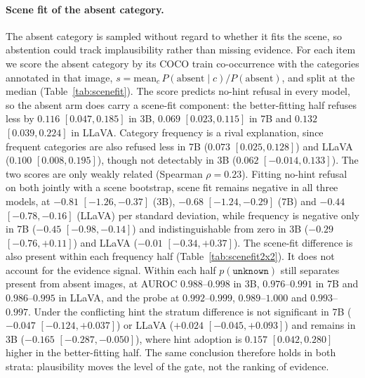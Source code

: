 \documentclass[10pt]{article}
\newcommand{\unknown}{\texttt{unknown}}
\newcommand{\punk}{p(\unknown)}
\begin{document}
\paragraph{Scene fit of the absent category.}
The absent category is sampled without regard to whether it fits the scene, so abstention could track implausibility rather than missing evidence. For each item we score the absent category by its COCO train co-occurrence with the categories annotated in that image, $s=\mathrm{mean}_c\,P(\text{absent}\mid c)/P(\text{absent})$, and split at the median (Table~\ref{tab:scenefit}). The score predicts no-hint refusal in every model, so the absent arm does carry a scene-fit component: the better-fitting half refuses less by $0.116$ $[0.047,0.185]$ in 3B, $0.069$ $[0.023,0.115]$ in 7B and $0.132$ $[0.039,0.224]$ in LLaVA. Category frequency is a rival explanation, since frequent categories are also refused less in 7B ($0.073$ $[0.025,0.128]$) and LLaVA ($0.100$ $[0.008,0.195]$), though not detectably in 3B ($0.062$ $[-0.014,0.133]$). The two scores are only weakly related (Spearman $\rho=0.23$). Fitting no-hint refusal on both jointly with a scene bootstrap, scene fit remains negative in all three models, at $-0.81$ $[-1.26,-0.37]$ (3B), $-0.68$ $[-1.24,-0.29]$ (7B) and $-0.44$ $[-0.78,-0.16]$ (LLaVA) per standard deviation, while frequency is negative only in 7B ($-0.45$ $[-0.98,-0.14]$) and indistinguishable from zero in 3B ($-0.29$ $[-0.76,+0.11]$) and LLaVA ($-0.01$ $[-0.34,+0.37]$). The scene-fit difference is also present within each frequency half (Table~\ref{tab:scenefit2x2}). It does not account for the evidence signal. Within each half $\punk$ still separates present from absent images, at AUROC $0.988$--$0.998$ in 3B, $0.976$--$0.991$ in 7B and $0.986$--$0.995$ in LLaVA, and the probe at $0.992$--$0.999$, $0.989$--$1.000$ and $0.993$--$0.997$. Under the conflicting hint the stratum difference is not significant in 7B ($-0.047$ $[-0.124,+0.037]$) or LLaVA ($+0.024$ $[-0.045,+0.093]$) and remains in 3B ($-0.165$ $[-0.287,-0.050]$), where hint adoption is $0.157$ $[0.042,0.280]$ higher in the better-fitting half. The same conclusion therefore holds in both strata: plausibility moves the level of the gate, not the ranking of evidence.
\end{document}
